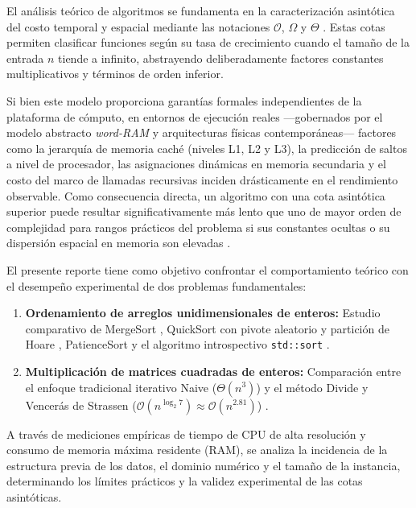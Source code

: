 El análisis teórico de algoritmos se fundamenta en la caracterización asintótica del costo temporal y espacial mediante las notaciones $\mathcal{O}$, $\Omega$ y $\Theta$ . Estas cotas permiten clasificar funciones según su tasa de crecimiento cuando el tamaño de la entrada $n$ tiende a infinito, abstrayendo deliberadamente factores constantes multiplicativos y términos de orden inferior.

Si bien este modelo proporciona garantías formales independientes de la plataforma de cómputo, en entornos de ejecución reales —gobernados por el modelo abstracto \textit{word-RAM} y arquitecturas físicas contemporáneas— factores como la jerarquía de memoria caché (niveles L1, L2 y L3), la predicción de saltos a nivel de procesador, las asignaciones dinámicas en memoria secundaria y el costo del marco de llamadas recursivas inciden drásticamente en el rendimiento observable. Como consecuencia directa, un algoritmo con una cota asintótica superior puede resultar significativamente más lento que uno de mayor orden de complejidad para rangos prácticos del problema si sus constantes ocultas o su dispersión espacial en memoria son elevadas .

El presente reporte tiene como objetivo confrontar el comportamiento teórico con el desempeño experimental de dos problemas fundamentales:
\begin{enumerate}
    \item \textbf{Ordenamiento de arreglos unidimensionales de enteros:} Estudio comparativo de MergeSort , QuickSort con pivote aleatorio y partición de Hoare , PatienceSort y el algoritmo introspectivo \texttt{std::sort} .
    \item \textbf{Multiplicación de matrices cuadradas de enteros:} Comparación entre el enfoque tradicional iterativo Naive ($\Theta(n^3)$)  y el método Divide y Vencerás de Strassen ($\mathcal{O}(n^{\log_2 7}) \approx \mathcal{O}(n^{2.81})$) .
\end{enumerate}

A través de mediciones empíricas de tiempo de CPU de alta resolución y consumo de memoria máxima residente (RAM), se analiza la incidencia de la estructura previa de los datos, el dominio numérico y el tamaño de la instancia, determinando los límites prácticos y la validez experimental de las cotas asintóticas.
